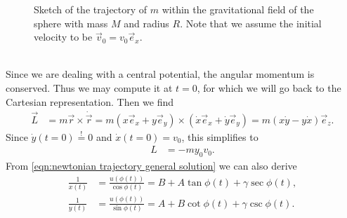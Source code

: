 \documentclass[english, parskip=full]{scrartcl}
\newcommand{\kla}{}
\begin{document}
\begin{figure}[!ht]
\begin{tikzpicture}[scale=1,cap=round]
%        
%        
%        
%        
%        
%        
%        
%        
        
    \end{tikzpicture}
    \caption{Sketch of the trajectory of $m$ within the gravitational field of the sphere with mass $M$ and radius $R$.
    Note that we assume the initial velocity to be $\vec{v}_0 = v_0\vec{e}_x$.}
    \label{figure:sketch newtonian trajectory}
\end{figure}\\
Since we are dealing with a central potential, the angular momentum is conserved.
Thus we may compute it at $t=0$, for which we will go back to the Cartesian representation.
Then we find
\begin{align}
\vec{L} &= m\vec{r} \times \dot{\vec{r}} = m\kla\left( x\vec{e}_x + y\vec{e}_y \right) \times \kla\left( \dot{x}\vec{e}_x + \dot{y}\vec{e}_y \right) = m\kla\left( x\dot{y} - y\dot{x} \right)\vec{e}_z.
\end{align}
Since $\dot{y}(t=0) \overset{!}{=} 0$ and $\dot{x}(t=0) = v_0$, this simplifies to 
\begin{align}
L &= -my_0v_0.
\end{align}
From \autoref{eqn:newtonian trajectory general solution} we can also derive
\begin{align}
\frac{1}{x(t)} &= \frac{u(\phi(t))}{\cos\phi(t)} = B + A\tan\phi(t) + \gamma\sec\phi (t), \\
\frac{1}{y(t)} &= \frac{u(\phi(t))}{\sin\phi(t)} = A + B\cot\phi(t) + \gamma\csc\phi(t).
\end{align}
\end{document}
